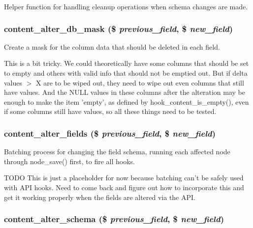 Helper function for handling cleanup operations when schema changes are made. \hypertarget{content_8admin_8inc_479029a53f7baaaa778379e3ba5082f2}{
\subsubsection[{content\_\-alter\_\-db\_\-mask}]{\setlength{\rightskip}{0pt plus 5cm}content\_\-alter\_\-db\_\-mask (\$ {\em previous\_\-field}, \/  \$ {\em new\_\-field})}}
\label{content_8admin_8inc_479029a53f7baaaa778379e3ba5082f2}


Create a mask for the column data that should be deleted in each field.

This is a bit tricky. We could theoretically have some columns that should be set to empty and others with valid info that should not be emptied out. But if delta values $>$ X are to be wiped out, they need to wipe out even columns that still have values. And the NULL values in these columns after the alteration may be enough to make the item 'empty', as defined by hook\_\-content\_\-is\_\-empty(), even if some columns still have values, so all these things need to be tested. \hypertarget{content_8admin_8inc_e26b077ad5c1a9d5b0dc25a9e7a1d38b}{
\subsubsection[{content\_\-alter\_\-fields}]{\setlength{\rightskip}{0pt plus 5cm}content\_\-alter\_\-fields (\$ {\em previous\_\-field}, \/  \$ {\em new\_\-field})}}
\label{content_8admin_8inc_e26b077ad5c1a9d5b0dc25a9e7a1d38b}


Batching process for changing the field schema, running each affected node through node\_\-save() first, to fire all hooks.

TODO This is just a placeholder for now because batching can't be safely used with API hooks. Need to come back and figure out how to incorporate this and get it working properly when the fields are altered via the API. \hypertarget{content_8admin_8inc_5bd91e396b908f6bc2d48f64925bf4d5}{
\subsubsection[{content\_\-alter\_\-schema}]{\setlength{\rightskip}{0pt plus 5cm}content\_\-alter\_\-schema (\$ {\em previous\_\-field}, \/  \$ {\em new\_\-field})}}
\label{content_8admin_8inc_5bd91e396b908f6bc2d48f64925bf4d5}



